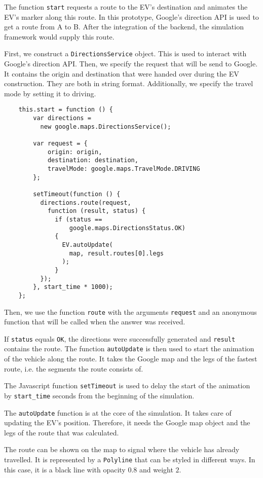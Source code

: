 The function \texttt{start} requests a route to the EV's destination and animates the EV's marker along this route. In this prototype, Google's direction API is used to get a route from A to B. After the integration of the backend, the simulation framework would supply this route.

First, we construct a \texttt{DirectionsService} object. This is used to interact with Google's direction API. Then, we specify the request that will be send to Google. It contains the origin and destination that were handed over during the EV construction. They are both in string format. Additionally, we specify the travel mode by setting it to driving.

\begin{verbatim}
    this.start = function () {
        var directions =
          new google.maps.DirectionsService();

        var request = {
            origin: origin,
            destination: destination,
            travelMode: google.maps.TravelMode.DRIVING
        };

        setTimeout(function () {
          directions.route(request,
            function (result, status) {
              if (status ==
                  google.maps.DirectionsStatus.OK)
              {
                EV.autoUpdate(
                  map, result.routes[0].legs
                );
              }
          });
        }, start_time * 1000);
    };
\end{verbatim}

Then, we use the function \texttt{route} with the arguments \texttt{request} and an anonymous function that will be called when the answer was received.

If \texttt{status} equals \texttt{OK}, the directions were successfully generated and \texttt{result} contains the route. The function \texttt{autoUpdate} is then used to start the animation of the vehicle along the route. It takes the Google map and the legs of the fastest route, i.e. the segments the route consists of.

The Javascript function \texttt{setTimeout} is used to delay the start of the animation by \texttt{start\_time} seconds from the beginning of the simulation.

The \texttt{autoUpdate} function is at the core of the simulation. It takes care of updating the EV's position. Therefore, it needs the Google map object and the legs of the route that was calculated.

The route can be shown on the map to signal where the vehicle has already travelled. It is represented by a \texttt{Polyline} that can be styled in different ways. In this case, it is a black line with opacity $0.8$ and weight $2$.

